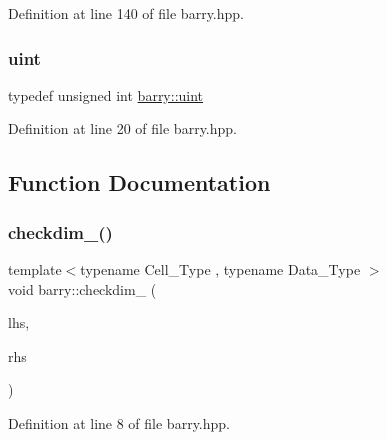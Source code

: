 Definition at line 140 of file barry.\+hpp.

\mbox{\label{namespacebarry_a11dfc53ddb4672278319aa04f1e09a6c}} 
\subsubsection{\texorpdfstring{uint}{uint}}
{\footnotesize\ttfamily typedef unsigned int \hyperlink{namespacebarry_a11dfc53ddb4672278319aa04f1e09a6c}{barry\+::uint}}



Definition at line 20 of file barry.\+hpp.



\subsection{Function Documentation}
\mbox{\label{namespacebarry_a4ec765fc621c31c4ce712443cc4610c3}} 
\subsubsection{\texorpdfstring{checkdim\+\_\+()}{checkdim\_()}}
{\footnotesize\ttfamily template$<$typename Cell\+\_\+\+Type , typename Data\+\_\+\+Type $>$ \\
void barry\+::checkdim\+\_\+ (\begin{DoxyParamCaption}\item[{const \hyperlink{classbarry_1_1_b_array}{B\+Array}$<$ Cell\+\_\+\+Type, Data\+\_\+\+Type $>$ \&}]{lhs,  }\item[{const \hyperlink{classbarry_1_1_b_array}{B\+Array}$<$ Cell\+\_\+\+Type, Data\+\_\+\+Type $>$ \&}]{rhs }\end{DoxyParamCaption})\hspace{0.3cm}{\ttfamily [inline]}}



Definition at line 8 of file barry.\+hpp.

\mbox{\label{namespacebarry_a1cb28b501bc7f88c0b3d68d51ad672e1}} 
